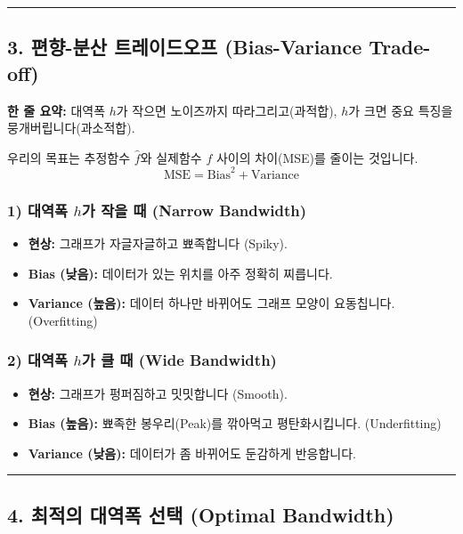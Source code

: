 \documentclass[11pt,a4paper]{book}
\theoremstyle{definition}
\begin{document}
\vspace{0.5cm}\hrule\vspace{0.5cm}

\subsection{3. 편향-분산 트레이드오프 (Bias-Variance Trade-off)}

\begin{conceptbox}[title={개념 3: 너무 섬세해도, 너무 둔감해도 안 된다}]
\textbf{한 줄 요약:} 대역폭 $h$가 작으면 노이즈까지 따라그리고(과적합), $h$가 크면 중요 특징을 뭉개버립니다(과소적합).
\end{conceptbox}


우리의 목표는 추정함수 $\hat{f}$와 실제함수 $f$ 사이의 차이(MSE)를 줄이는 것입니다.
$$ \text{MSE} = \text{Bias}^2 + \text{Variance} $$

\subsubsection*{1) 대역폭 $h$가 작을 때 (Narrow Bandwidth)}
\begin{itemize}
    \item \textbf{현상:} 그래프가 자글자글하고 뾰족합니다 (Spiky).
    \item \textbf{Bias (낮음):} 데이터가 있는 위치를 아주 정확히 찌릅니다.
    \item \textbf{Variance (높음):} 데이터 하나만 바뀌어도 그래프 모양이 요동칩니다. (Overfitting)
\end{itemize}

\subsubsection*{2) 대역폭 $h$가 클 때 (Wide Bandwidth)}
\begin{itemize}
    \item \textbf{현상:} 그래프가 펑퍼짐하고 밋밋합니다 (Smooth).
    \item \textbf{Bias (높음):} 뾰족한 봉우리(Peak)를 깎아먹고 평탄화시킵니다. (Underfitting)
    \item \textbf{Variance (낮음):} 데이터가 좀 바뀌어도 둔감하게 반응합니다.
\end{itemize}

\vspace{0.5cm}\hrule\vspace{0.5cm}

\subsection{4. 최적의 대역폭 선택 (Optimal Bandwidth)}
\end{document}
